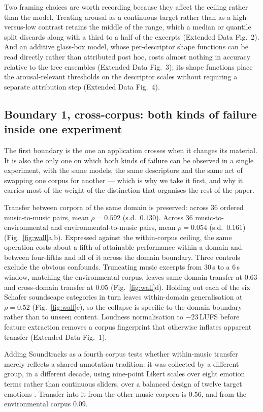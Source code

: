 Two framing choices are worth recording because they affect the ceiling rather than
the model. Treating arousal as a continuous target rather than as a
high-versus-low contrast retains the middle of the range, which a median or
quantile split discards along with a third to a half of the excerpts (Extended Data
Fig.~2). And an additive glass-box model, whose per-descriptor shape functions can
be read directly rather than attributed post hoc, costs almost nothing in accuracy
relative to the tree ensembles (Extended Data Fig.~3); its shape functions place
the arousal-relevant thresholds on the descriptor scales without requiring a
separate attribution step (Extended Data Fig.~4).

\subsection*{Boundary 1, cross-corpus: both kinds of failure inside one experiment}

The first boundary is the one an application crosses when it changes its material.
It is also the only one on which both kinds of failure can be observed in a single
experiment, with the same models, the same descriptors and the same act of swapping
one corpus for another --- which is why we take it first, and why it carries most
of the weight of the distinction that organises the rest of the paper.

Transfer between corpora of the same domain is preserved: across 36 ordered
music-to-music pairs, mean $\rho = 0.592$ (s.d.\ $0.130$). Across 36
music-to-environmental and environmental-to-music pairs, mean $\rho = 0.054$
(s.d.\ $0.161$) (Fig.~\ref{fig:wall}a,b). Expressed against the within-corpus
ceiling, the same operation costs about a fifth of attainable performance within a
domain and between four-fifths and all of it across the domain boundary. Three controls exclude the obvious
confounds. Truncating music excerpts from 30\,s to a 6\,s window, matching the
environmental corpus, leaves same-domain transfer at $0.63$ and cross-domain
transfer at $0.05$ (Fig.~\ref{fig:wall}d). Holding out each of the six Schafer
soundscape categories in turn leaves within-domain generalisation at $\rho = 0.52$
(Fig.~\ref{fig:wall}e), so the collapse is specific to the domain boundary rather
than to unseen content. Loudness normalisation to $-23$\,LUFS before feature
extraction removes a corpus fingerprint that otherwise inflates apparent transfer
(Extended Data Fig.~1).

Adding Soundtracks as a fourth corpus tests whether within-music transfer merely
reflects a shared annotation tradition: it was collected by a different group, in a
different decade, using nine-point Likert scales over eight emotion terms rather
than continuous sliders, over a balanced design of twelve target emotions
\citep{eerola2011}. Transfer into it from the other music corpora is $0.56$, and
from the environmental corpus $0.09$.

